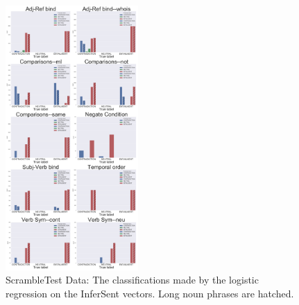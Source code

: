 \documentclass[10pt,letterpaper]{article}
\begin{document}
\begin{figure}[ht!]
\centering
\includegraphics[width=0.45\textwidth]{AllHistsInferSentLogReg.png}
\caption{ScrambleTest Data: The classifications made by the logistic regression on the InferSent vectors. Long noun phrases are hatched.}
\label{fig:IShistLR}
\end{figure}
\end{document}
